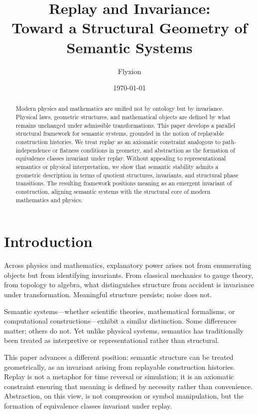 \documentclass[11pt]{article}
\title{Replay and Invariance:\\
Toward a Structural Geometry of Semantic Systems}
\author{Flyxion}
\date{\today}
\begin{document}
\maketitle

\begin{abstract}
Modern physics and mathematics are unified not by ontology but by invariance. Physical laws, geometric structures, and mathematical objects are defined by what remains unchanged under admissible transformations. This paper develops a parallel structural framework for semantic systems, grounded in the notion of replayable construction histories. We treat replay as an axiomatic constraint analogous to path-independence or flatness conditions in geometry, and abstraction as the formation of equivalence classes invariant under replay. Without appealing to representational semantics or physical interpretation, we show that semantic stability admits a geometric description in terms of quotient structures, invariants, and structural phase transitions. The resulting framework positions meaning as an emergent invariant of construction, aligning semantic systems with the structural core of modern mathematics and physics.
\end{abstract}

\section{Introduction}

Across physics and mathematics, explanatory power arises not from enumerating objects but from identifying invariants. From classical mechanics to gauge theory, from topology to algebra, what distinguishes structure from accident is invariance under transformation. Meaningful structure persists; noise does not.

Semantic systems—whether scientific theories, mathematical formalisms, or computational constructions—exhibit a similar distinction. Some differences matter; others do not. Yet unlike physical systems, semantics has traditionally been treated as interpretive or representational rather than structural.

This paper advances a different position: semantic structure can be treated geometrically, as an invariant arising from replayable construction histories. Replay is not a metaphor for time reversal or simulation; it is an axiomatic constraint ensuring that meaning is defined by necessity rather than convenience. Abstraction, on this view, is not compression or symbol manipulation, but the formation of equivalence classes invariant under replay.
\end{document}
